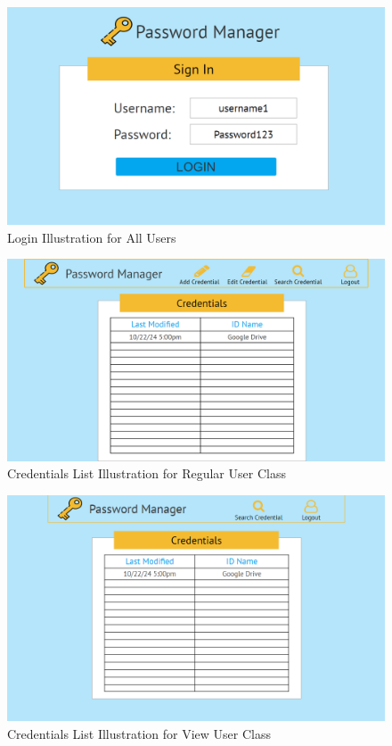 \documentclass[letterpaper,12pt,oneside,listof=totoc]{scrreprt}
\begin{document}
\begin{figure}
\centering
\includegraphics[width=\linewidth]{UI_login.png}
\caption{Login Illustration for All Users}
\label{Login}
\end{figure}

\begin{figure}
\centering
\includegraphics[width=\linewidth]{NewUI.png}
\caption{Credentials List Illustration for Regular User Class}
\label{CredList_RU}
\end{figure}

\begin{figure}
\centering
\includegraphics[width=\linewidth]{UI_CredentialList_VO.png}
\caption{Credentials List Illustration for View User Class}
\label{CredList_VU}
\end{figure}
\end{document}
